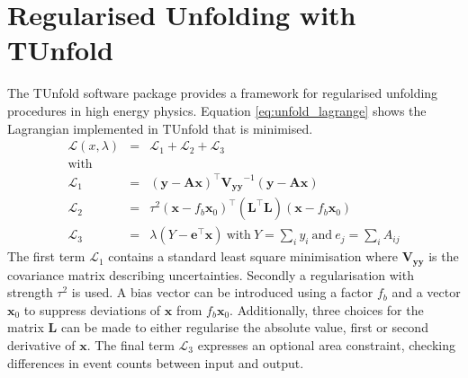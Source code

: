 \section{Regularised Unfolding with TUnfold}
	The TUnfold software package \cite{tunfold} provides a framework for regularised unfolding procedures in high energy physics. Equation \ref{eq:unfold_lagrange} shows the Lagrangian implemented in TUnfold that is minimised.
	\begin{eqnarray}
	\label{eq:unfold_lagrange}
	\mathcal{L}(x,\lambda) &=& \mathcal{L}_1 + \mathcal{L}_2 + \mathcal{L}_3 
	\\ \nonumber \text{with}
	\\ 
	\label{eq:unfold_lagrange1}
	\mathcal{L}_1 &=& (\mathbf{y} - \mathbf{Ax})^\intercal \mathbf{V_{yy}}^{-1} (\mathbf{y} - \mathbf{Ax}) 
	\\
	\label{eq:unfold_lagrange2}
	\mathcal{L}_2 &=& \tau^2 (\mathbf{x} - f_b \mathbf{x}_0)^\intercal (\mathbf{L}^\intercal \mathbf{L}) (\mathbf{x} - f_b \mathbf{x}_0) 
	\\
	\label{eq:unfold_lagrange3}
	\mathcal{L}_3 &=& \lambda (Y-\mathbf{e}^\intercal \mathbf{x}) \ \text{with} \ Y=\sum_{i} y_i \ \text{and} \ e_j = \sum_{i}A_{ij}
	\end{eqnarray}
	The first term $\mathcal{L}_1$ contains a standard least square minimisation where $\mathbf{V_{yy}}$ is the covariance matrix describing uncertainties. Secondly a regularisation with strength $\tau^2$ is used. A bias vector can be introduced using a factor $f_b$ and a vector $\mathbf{x}_0$ to suppress deviations of $\mathbf{x}$ from $f_b\mathbf{x}_0$. Additionally, three choices for the matrix $\mathbf{L}$ can be made to either regularise the absolute value, first or second derivative of $\mathbf{x}$. The final term $\mathcal{L}_3$ expresses an optional area constraint, checking differences in event counts between input and output.
 